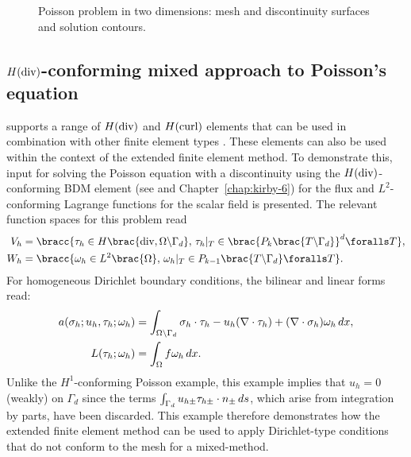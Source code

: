 \begin{figure}
{    \label{fig:nikbakht:poisson_contours_b}}
  \caption{Poisson problem in two dimensions:
   mesh and discontinuity surfaces
  and  solution contours.}
  \label{fig:nikbakht:poisson_contours}
\end{figure}

\subsection{$H(\rm div)$-conforming mixed approach to Poisson's equation}

\ffc{} supports a range of $H(\rm div)$ and $H(\rm curl)$ elements
that can be used in combination with other finite element types
\citep{RognesKirbyLogg2009}. These elements can also be used within the
context of the extended finite element method. To demonstrate this, \ufl{}
input for solving the Poisson equation with a discontinuity using the
$H(\rm div)$-conforming BDM element (see \citet{BrezziDouglasMarini1985}
and Chapter~\ref{chap:kirby-6}) for the flux and $L^{2}$-conforming Lagrange
functions for the scalar field is presented.  The relevant function
spaces for this problem read
%
\begin{align}
  V_{h} &= \bracc{\vect{\tau}_{h} \in H\brac{{\rm div}, \Omega\backslash\Gamma_{d}}, \,
         \vect{\tau}_{h}|_{T} \in \brac{P_{k}\brac{T \backslash \Gamma_{d}}}^{d} \foralls T},
\label{eqn:nikbakht:BDM_space}
\\
  W_{h} &= \bracc{\omega_{h} \in L^{2}\brac{\Omega}, \,
         \omega_{h}|_{T} \in P_{k-1}\brac{T \backslash \Gamma_{d}}\foralls T}.
\label{eqn:nikbakht:DG_space}
\end{align}
%
For homogeneous Dirichlet boundary conditions, the bilinear and linear
forms read:
%
\begin{align}
  a(\sigma_{h}; u_{h}, \tau_{h}; \omega_{h})
    &= \int_{\Omega\backslash\Gamma_{d}} \sigma_{h} \cdot  \tau_{h}
        - u_{h} (\nabla \cdot \tau_{h}) + (\nabla \cdot \sigma_{h}) \omega_{h} \, d x,
\\
  L(\tau_{h}; \omega_{h}) &= \int_{\Omega} f \omega_{h}  \, d x.
\end{align}
%
Unlike the $H^{1}$-conforming Poisson example, this example implies that
$u_{h} = 0$ (weakly) on $\Gamma_{d}$ since the terms $\int_{\Gamma_{d}}
u_{h\pm} \tau_{h\pm} \cdot n_{\pm} \, d s$, which arise
from integration by parts, have been discarded.  This example therefore
demonstrates how the extended finite element method can be used to
apply Dirichlet-type conditions that do not conform to the mesh for
a mixed-method.

